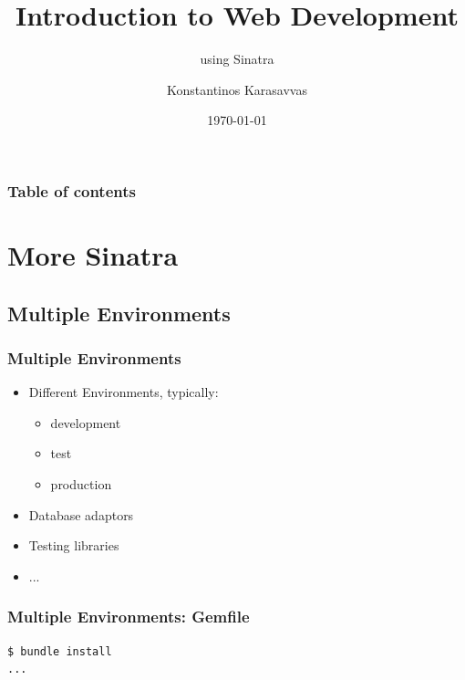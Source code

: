 \documentclass{beamer}
\begin{document}
\title{Introduction to Web Development}
\subtitle{using Sinatra}
\author[Konstantinos Karasavvas]{Konstantinos Karasavvas} %

\date{\today} 

\begin{frame}
  \titlepage
\end{frame}

\begin{frame}
\setcounter{tocdepth}{2}
\frametitle{Table of contents}
\tableofcontents
\end{frame} 





\section{More Sinatra}

\subsection{Multiple Environments} 
\begin{frame}\frametitle{Multiple Environments} 
  \begin{itemize}
    \item Different Environments, typically: 
    \begin{itemize}
      \item development
      \item test
      \item production
    \end{itemize}

    \item Database adaptors
    \item Testing libraries
    \item ...        
  \end{itemize}
\end{frame}



\begin{frame}[fragile]\frametitle{Multiple Environments: Gemfile} 

  
  
  \begin{lstlisting}[language=bash, escapechar={^}]
$ bundle install
...
  \end{lstlisting}

\end{frame}
\end{document}
